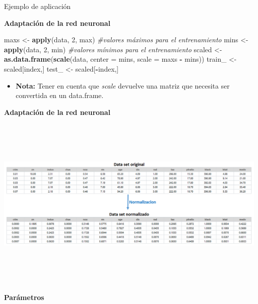 \documentclass[
  ignorenonframetext,
]{beamer}
\newenvironment{Shaded}{\begin{snugshade}}{\end{snugshade}}
\newcommand{\CommentTok}[1]{\textcolor[rgb]{0.56,0.35,0.01}{\textit{#1}}}
\newcommand{\DataTypeTok}[1]{\textcolor[rgb]{0.13,0.29,0.53}{#1}}
\newcommand{\DecValTok}[1]{\textcolor[rgb]{0.00,0.00,0.81}{#1}}
\newcommand{\KeywordTok}[1]{\textcolor[rgb]{0.13,0.29,0.53}{\textbf{#1}}}
\newcommand{\NormalTok}[1]{#1}
\newcommand{\OperatorTok}[1]{\textcolor[rgb]{0.81,0.36,0.00}{\textbf{#1}}}
\newcommand{\StringTok}[1]{\textcolor[rgb]{0.31,0.60,0.02}{#1}}
\providecommand{\tightlist}{%
  \setlength{\itemsep}{0pt}\setlength{\parskip}{0pt}}
\begin{document}
\begin{frame}[fragile]{Ejemplo de aplicación}
\begin{block}{\textbf{Adaptación de la red neuronal}}
\begin{Shaded}
\begin{Highlighting}[]
\NormalTok{maxs <-}\StringTok{ }\KeywordTok{apply}\NormalTok{(data, }\DecValTok{2}\NormalTok{, max) }\CommentTok{#valores máximos para el entrenamiento}
\NormalTok{mins <-}\StringTok{ }\KeywordTok{apply}\NormalTok{(data, }\DecValTok{2}\NormalTok{, min) }\CommentTok{#valores mínimos para el entrenamiento}
\NormalTok{scaled <-}\StringTok{ }\KeywordTok{as.data.frame}\NormalTok{(}\KeywordTok{scale}\NormalTok{(data, }\DataTypeTok{center =}\NormalTok{ mins, }\DataTypeTok{scale =}\NormalTok{ maxs }\OperatorTok{-}\StringTok{ }\NormalTok{mins))}
\NormalTok{train_ <-}\StringTok{ }\NormalTok{scaled[index,]}
\NormalTok{test_ <-}\StringTok{ }\NormalTok{scaled[}\OperatorTok{-}\NormalTok{index,]}
\end{Highlighting}
\end{Shaded}

\begin{itemize}
\tightlist
\item
  \textbf{Nota:} Tener en cuenta que \emph{scale} devuelve una matriz
  que necesita ser convertida en un data.frame.
\end{itemize}

\end{block}

\begin{block}{\textbf{Adaptación de la red neuronal}}

\includegraphics[width=\textwidth,height=3.33333in]{normalizacion.png}

\end{block}

\begin{block}{\textbf{Parámetros}}


\end{block}
\end{frame}
\end{document}
